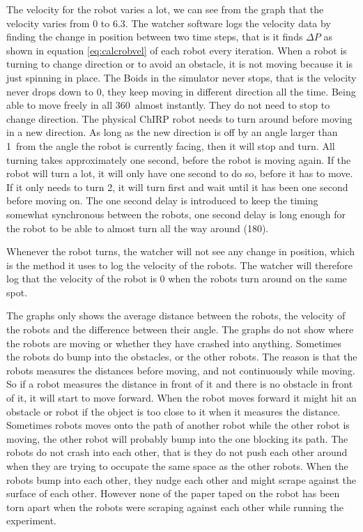 The velocity for the robot varies a lot, we can see from the graph that the velocity varies from 0 to 6.3. The watcher software logs the velocity data by finding the change in position between two time steps, that is it finds $\Delta P$ as shown in equation \ref{eq:calcrobvel} of each robot every iteration. When a robot is turning to change direction or to avoid an obstacle, it is not moving because it is just spinning in place. 
The Boids in the simulator never stops, that is the velocity never drops down to 0, they keep moving in different direction all the time. Being able to move freely in all 360\textdegree\ almost instantly. They do not need to stop to change direction.
The physical ChIRP robot needs to turn around before moving in a new direction. As long as the new direction is off by an angle larger than 1\textdegree\ from the angle the robot is currently facing, then it will stop and turn. All turning takes approximately one second, before the robot is moving again. If the robot will turn a lot, it will only have one second to do so, before it has to move. If it only needs to turn 2\textdegree, it will turn first and wait until it has been one second before moving on.
The one second delay is introduced to keep the timing somewhat synchronous between the robots, one second delay is long enough for the robot to be able to almost turn all the way around (180\textdegree). 

Whenever the robot turns, the watcher will not see any change in position, which is the method it uses to log the velocity of the robots. The watcher will therefore log that the velocity of the robot is 0 when the robots turn around on the same spot. 

The graphs only shows the average distance between the robots, the velocity of the robots and the difference between their angle. The graphs do not show where the robots are moving or whether they have crashed into anything.
Sometimes the robots do bump into the obstacles, or the other robots. The reason is that the robots measures the distances before moving, and not continuously while moving. So if a robot measures the distance in front of it and there is no obstacle in front of it, it will start to move forward. When the robot moves forward it might hit an obstacle or robot if the object is too close to it when it measures the distance. Sometimes robots moves onto the path of another robot while the other robot is moving, the other robot will probably bump into the one blocking its path. The robots do not crash into each other, that is they do not push each other around when they are trying to occupate the same space as the other robots. When the robots bump into each other, they nudge each other and might scrape against the surface of each other. However none of the paper taped on the robot has been torn apart when the robots were scraping against each other while running the experiment.

